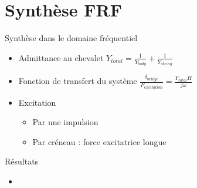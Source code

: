 \section{Synthèse FRF}

\begin{frame}{Synthèse dans le domaine fréquentiel}

 \begin{itemize}
  \item Admittance au chevalet
  \( {Y_{total}} = \frac{1}{Y_{body}} + \frac{1}{Y_{string}} \)
  
  \item Fonction de transfert du système
  \( \frac{\delta_{bridge}}{F_{excitation}} = \frac{Y_{total}H}{j\omega} \)

  \item Excitation
  	\begin{itemize}
	 \item Par une impulsion
     \item Par créneau : force excitatrice longue
     \end{itemize}

   
 \end{itemize}
\end{frame}

\begin{frame}{Résultats}

	\begin{itemize}
		\item	

	\end{itemize}
\end{frame}